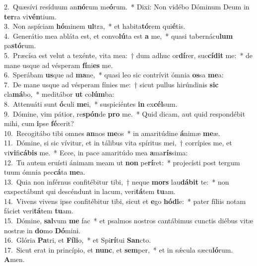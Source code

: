 {2.~}Quæsívi resíduum an\textbf{nó}rum me\textbf{ó}rum.~* Dixi: Non vidébo Dóminum Deum in \textbf{ter}ra vi\textbf{vén}tium.\\
{3.~}Non aspíciam \textbf{hó}minem \textbf{ul}tra,~* et habita\textbf{tó}rem qui\textbf{é}tis.\\
{4.~}Generátio mea abláta est, et convo\textbf{lú}ta est \textbf{a} me,~* quasi tabernácu\textbf{lum} pa\textbf{stó}rum.\\
{5.~}Præcísa est velut a texénte, vita mea:~† dum adhuc or\textbf{dí}rer, suc\textbf{cí}\textbf{dit} me:~* de mane usque ad vésperam \textbf{fí}ni\textbf{es} me.\\
{6.~}Sperábam \textbf{us}que ad \textbf{ma}ne,~* quasi leo sic contrívit ómnia \textbf{os}sa \textbf{me}a:\\
{7.~}De mane usque ad vésperam fínies me:~† sicut pullus hirúndinis \textbf{sic} cla\textbf{má}bo,~* meditábor \textbf{ut} co\textbf{lúm}ba:\\
{8.~}Attenuáti sunt \textbf{ó}culi \textbf{me}i,~* suspiciéntes \textbf{in} ex\textbf{cél}sum.\\
{9.~}Dómine, vim pátior, re\textbf{spón}de \textbf{pro} me.~* Quid dicam, aut quid respondébit mihi, cum \textbf{i}pse \textbf{fé}cerit?\\
{10.~}Recogitábo tibi omnes \textbf{an}nos \textbf{me}os~* in amaritúdine \textbf{á}nimæ \textbf{me}æ.\\
{11.~}Dómine, si sic vívitur, et in tálibus vita spíritus mei,~† corrípies me, et vi\textbf{vi}fi\textbf{cá}\textbf{bis} me.~* Ecce, in pace amaritúdo mea \textbf{a}ma\textbf{rís}sima:\\
{12.~}Tu autem eruísti ánimam meam ut \textbf{non} pe\textbf{rí}ret:~* projecísti post tergum tuum ómnia pec\textbf{cá}ta \textbf{me}a.\\
{13.~}Quia non inférnus confitébitur tibi,~† neque \textbf{mors} lau\textbf{dá}\textbf{bit} te:~* non exspectábunt qui descéndunt in lacum, veri\textbf{tá}tem \textbf{tu}am.\\
{14.~}Vivens vivens ipse confitébitur tibi, sicut et \textbf{e}go \textbf{hó}\textbf{di}e:~* pater fíliis notam fáciet veri\textbf{tá}tem \textbf{tu}am.\\
{15.~}Dómine, \textbf{sal}vum \textbf{me} fac~* et psalmos nostros cantábimus cunctis diébus vitæ nostræ in \textbf{do}mo \textbf{Dó}mini.\\
{16.~}Glória \textbf{Pa}tri, et \textbf{Fí}\textbf{li}o,~* et Spi\textbf{rí}tui \textbf{San}cto.\\
{17.~}Sicut erat in princípio, et \textbf{nunc}, et \textbf{sem}per,~* et in sǽcula sæcu\textbf{ló}rum. \textbf{A}men.\\
